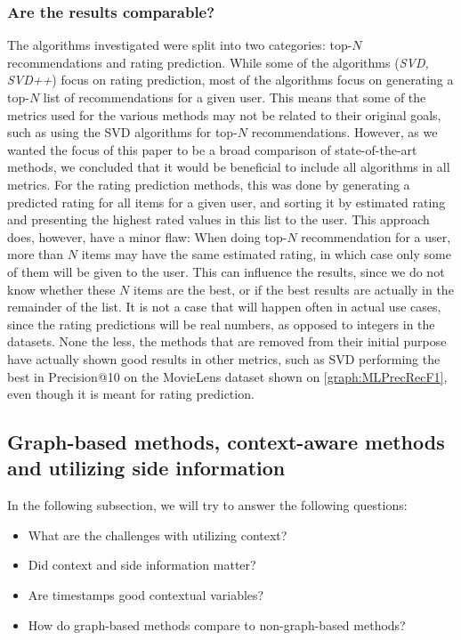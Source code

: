 \subsubsection{Are the results comparable?}
The algorithms investigated were split into two categories: top-$N$ recommendations and rating prediction.
While some of the algorithms (\textit{SVD, SVD++}) focus on rating prediction, most of the algorithms focus on generating a top-$N$ list of recommendations for a given user.
This means that some of the metrics used for the various methods may not be related to their original goals, such as using the SVD algorithms for top-$N$ recommendations.
However, as we wanted the focus of this paper to be a broad comparison of state-of-the-art methods, we concluded that it would be beneficial to include all algorithms in all metrics.
For the rating prediction methods, this was done by generating a predicted rating for all items for a given user, and sorting it by estimated rating and presenting the highest rated values in this list to the user.
This approach does, however, have a minor flaw: When doing top-$N$ recommendation for a user, more than $N$ items may have the same estimated rating, in which case only some of them will be given to the user.
This can influence the results, since we do not know whether these $N$ items are the best, or if the best results are actually in the remainder of the list.
It is not a case that will happen often in actual use cases, since the rating predictions will be real numbers, as opposed to integers in the datasets.
None the less, the methods that are removed from their initial purpose have actually shown good results in other metrics, such as SVD performing the best in Precision@10 on the MovieLens dataset shown on \autoref{graph:MLPrecRecF1}, even though it is meant for rating prediction.

\subsection{Graph-based methods, context-aware methods and utilizing side information}
In the following subsection, we will try to answer the following questions: 
\begin{itemize}
    \item What are the challenges with utilizing context?
    \item Did context and side information matter?
    \item Are timestamps good contextual variables?
    \item How do graph-based methods compare to non-graph-based methods?
\end{itemize}

